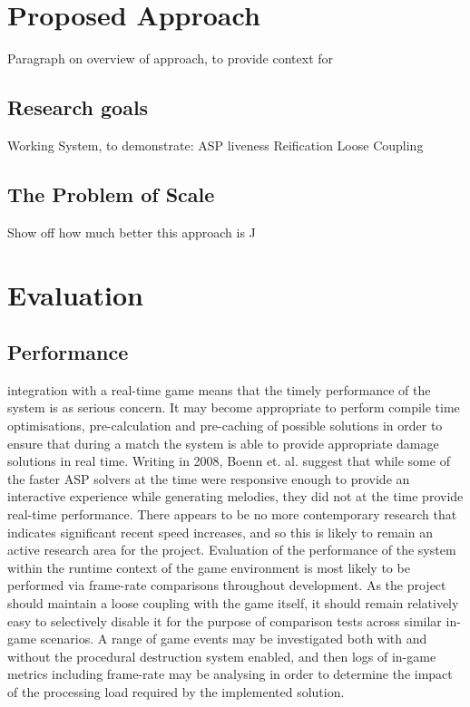 \documentclass[11pt]{report}
\begin{document}
\chapter{Proposed Approach}
	Paragraph on overview of approach, to provide context for
	\section{Research goals}
	Working System, to demonstrate:
		ASP liveness
		Reification
		Loose Coupling

	\section{The Problem of Scale}
		Show off how much better this approach is ^^

\chapter{Evaluation}
	\section{Performance}
		integration with a real-time game means that the timely performance of the system is as serious concern. It may become appropriate to perform compile time optimisations, pre-calculation and pre-caching of possible solutions in order to ensure that during a match the system is able to provide appropriate damage solutions in real time. 
		Writing in 2008, Boenn et. al. \cite{boenn2008automatic} suggest that while some of the faster ASP solvers at the time were responsive enough to provide an interactive experience while generating melodies, they did not at the time provide real-time performance. There appears to be no more contemporary research that indicates significant recent speed increases, and so this is likely to remain an active research area for the project.
		Evaluation of the performance of the system within the runtime context of the game environment is most likely to be performed via frame-rate comparisons throughout development. As the project should maintain a loose coupling with the game itself, it should remain relatively easy to selectively disable it for the purpose of comparison tests across similar in-game scenarios. A range of game events may be investigated both with and without the procedural destruction system enabled, and then logs of in-game metrics including frame-rate may be analysing in order to determine the impact of the processing load required by the implemented solution.
\end{document}
